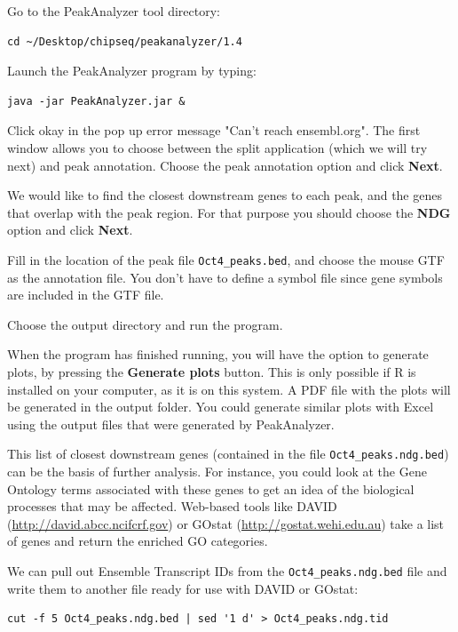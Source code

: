\begin{steps}
Go to the PeakAnalyzer tool directory:
\begin{lstlisting}
cd ~/Desktop/chipseq/peakanalyzer/1.4
\end{lstlisting}
Launch the PeakAnalyzer program by typing:
\begin{lstlisting}
java -jar PeakAnalyzer.jar &
\end{lstlisting}

Click okay in the pop up error message "Can't reach ensembl.org". 
The first window allows you to choose between the split application (which we
will try next) and peak annotation. Choose the peak annotation option and click
\textbf{Next}.

We would like to find the closest downstream genes to each peak, and the genes
that overlap with the peak region. For that purpose you should choose the
\textbf{NDG} option and click \textbf{Next}.

Fill in the location of the peak file \texttt{Oct4\_peaks.bed}, and choose the mouse GTF
as the annotation file. You don't have to define a symbol file since gene
symbols are included in the GTF file.

Choose the output directory and run the program.
\end{steps}

\begin{information}
When the program has finished running, you will have the option to generate
plots, by pressing the \textbf{Generate plots} button. This is only possible if R is
installed on your computer, as it is on this system. A PDF file with the plots will be generated in
the output folder. You could generate similar plots with Excel using the output files that
were generated by PeakAnalyzer. 
\end{information}

\begin{note}
This list of closest downstream genes (contained in the file
\texttt{Oct4\_peaks.ndg.bed}) can be the basis of further analysis. For instance,
you could look at the Gene Ontology terms associated with these genes to get an
idea of the biological processes that may be affected. Web-based tools like
DAVID (\url{http://david.abcc.ncifcrf.gov}) or GOstat
(\url{http://gostat.wehi.edu.au}) take a list of genes and return the enriched
GO categories.
\end{note}

\begin{bonus}
We can pull out Ensemble Transcript IDs from the \texttt{Oct4\_peaks.ndg.bed}
file and write them to another file ready for use with DAVID or GOstat:
\begin{lstlisting}
cut -f 5 Oct4_peaks.ndg.bed | sed '1 d' > Oct4_peaks.ndg.tid
\end{lstlisting}
\end{bonus}

